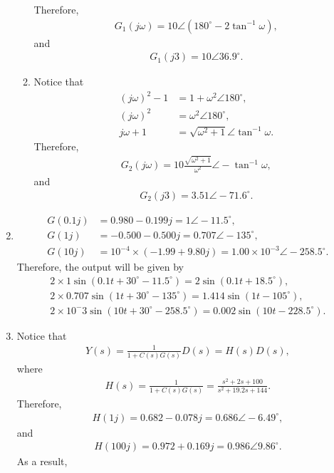 \documentclass{article}
\begin{document}
\begin{enumerate}
\begin{enumerate}
    Therefore,
    \begin{align*}
     G_1(j\omega) = 10\angle (180^\circ -2\tan^{-1}\omega),
    \end{align*}
    and
    \begin{align*}
      G_1(j3) = 10\angle 36.9^\circ.
    \end{align*}
  \item Notice that
    \begin{align*}
      (j\omega)^2 -1 &= 1+\omega^2\angle 180^\circ,\\
      (j\omega)^2  &= \omega^2\angle 180^\circ,\\
      j\omega+1  &= \sqrt{\omega^2+1}\angle \tan^{-1}\omega.
    \end{align*}
    Therefore,
    \begin{align*}
      G_2(j\omega) = 10\frac{\sqrt{\omega^2+1}}{\omega^2}\angle -\tan^{-1}\omega,
    \end{align*}
    and
    \begin{align*}
      G_2(j3) = 3.51\angle -71.6^\circ.
    \end{align*}
  \end{enumerate}
\item 
  \begin{align*}
    G(0.1j)&=0.980-0.199j = 1\angle -11.5^\circ,\\
G(1j) &= -0.500-0.500j = 0.707\angle -135^\circ,\\
G(10j) &= 10^{-4}\times (-1.99+9.80j) = 1.00\times 10^{-3}\angle -258.5^\circ.
  \end{align*}
Therefore, the output will be given by
\begin{align*}
  2\times 1 \sin(0.1t +30^\circ - 11.5^\circ) = 2\sin(0.1t+18.5^\circ),\\
  2\times 0.707 \sin(1t +30^\circ - 135^\circ) = 1.414\sin(1t-105^\circ),\\
  2\times 10^-3 \sin(10t +30^\circ - 258.5^\circ) = 0.002\sin(10t-228.5^\circ).
\end{align*}
\item Notice that
\begin{align*}
  Y(s) = \frac{1}{1+C(s)G(s)}D(s) = H(s)D(s),
\end{align*}
where
\begin{align*}
  H(s) = \frac{1}{1+C(s)G(s)} = \frac{s^2+2s+100}{s^2+19.2s+144}.
\end{align*}
Therefore,
\begin{align*}
  H(1j) = 0.682-0.078j = 0.686\angle -6.49^\circ,
\end{align*}
and
\begin{align*}
  H(100j) = 0.972+0.169j = 0.986\angle 9.86^\circ.
\end{align*}
As a result, 




\end{enumerate}
\end{document}
